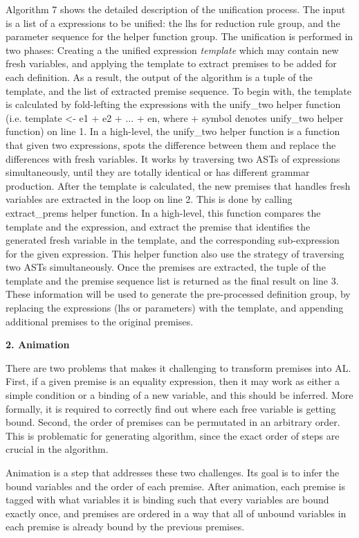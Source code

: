 Algorithm 7 shows the detailed description of the unification process.
The input is a list of a expressions to be unified: the lhs for reduction rule group, and the parameter
sequence for the helper function group.
The unification is performed in two phases: Creating a the unified expression \textit{template} which may
contain new fresh variables, and applying the template to extract premises to be added for each definition.
As a result, the output of the algorithm is a tuple of the template, and the list of extracted premise sequence.
To begin with, the template is calculated by fold-lefting the expressions
with the unify\_two helper function (i.e. template <- e1 + e2 + ... + en,
where + symbol denotes unify\_two helper function) on line 1.
In a high-level, the unify\_two helper function is a function that given two expressions,
spots the difference between them and replace the differences with fresh variables. It works by
traversing two ASTs of expressions simultaneously, until they are totally identical or
has different grammar production.
After the template is calculated, the new premises that handles fresh variables are extracted
in the loop on line 2. This is done by calling extract\_prems helper function. In a high-level,
this function compares the template and the expression, and extract the premise that identifies the
generated fresh variable in the template, and the corresponding sub-expression for the given expression.
This helper function also use the strategy of traversing two ASTs simultaneously. Once the premises are
extracted, the tuple of the template and the premise sequence list is returned as the final result on line 3.
These information will be used to generate the pre-processed definition group, by
replacing the expressions (lhs or parameters) with the template, and appending additional
premises to the original premises.


\textbf{2. Animation}

There are two problems that makes it challenging to transform premises into AL.
First, if a given premise is an equality expression, then it may work as either a simple condition or
a binding of a new variable, and this should be inferred. More formally, it is required to
correctly find out where each free variable is getting bound. Second, the order
of premises can be permutated in an arbitrary order. This is problematic for
generating algorithm, since the exact order of steps are crucial in the algorithm.

Animation is a step that addresses these two challenges. Its goal is to infer
the bound variables and the order of each premise.
After animation, each premise is tagged with what variables it is binding
such that every variables are bound exactly once, and premises are ordered in a way that
all of unbound variables in each premise is already bound by the previous premises.

